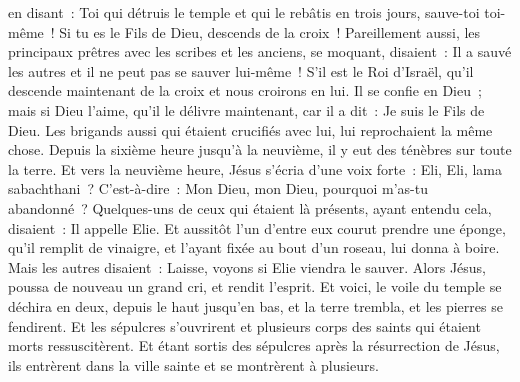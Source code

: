 \begin{multicols}{2}
en disant~: Toi qui détruis le temple et qui le rebâtis en trois jours, sauve-toi toi-même~! Si tu es le Fils de Dieu, descends de la croix~!
Pareillement aussi, les principaux prêtres avec les scribes et les anciens, se moquant, disaient~:
Il a sauvé les autres et il ne peut pas se sauver lui-même~! S'il est le Roi d'Israël, qu'il descende maintenant de la croix et nous croirons en lui.
Il se confie en Dieu~; mais si Dieu l'aime, qu'il le délivre maintenant, car il a dit~: Je suis le Fils de Dieu.
Les brigands aussi qui étaient crucifiés avec lui, lui reprochaient la même chose.
Depuis la sixième heure jusqu'à la neuvième, il y eut des ténèbres sur toute la terre.
Et vers la neuvième heure, Jésus s'écria d'une voix forte~: Eli, Eli, lama sabachthani~? C'est-à-dire~: Mon Dieu, mon Dieu, pourquoi m'as-tu abandonné~?
Quelques-uns de ceux qui étaient là présents, ayant entendu cela, disaient~: Il appelle Elie.
Et aussitôt l'un d'entre eux courut prendre une éponge, qu'il remplit de vinaigre, et l'ayant fixée au bout d'un roseau, lui donna à boire.
Mais les autres disaient~: Laisse, voyons si Elie viendra le sauver.
Alors Jésus, poussa de nouveau un grand cri, et rendit l'esprit.
Et voici, le voile du temple se déchira en deux, depuis le haut jusqu'en bas, et la terre trembla, et les pierres se fendirent.
Et les sépulcres s'ouvrirent et plusieurs corps des saints qui étaient morts ressuscitèrent.
Et étant sortis des sépulcres après la résurrection de Jésus, ils entrèrent dans la ville sainte et se montrèrent à plusieurs.

\end{multicols}
